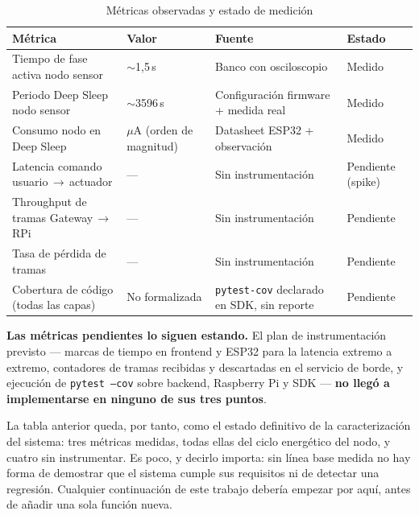 \begin{table}[H]
    \centering
    \caption{Métricas observadas y estado de medición}
    \begin{tabularx}{\textwidth}{Xlll}
        \toprule
        \textbf{Métrica}                                  & \textbf{Valor}            & \textbf{Fuente}                                & \textbf{Estado} \\
        \midrule
        Tiempo de fase activa nodo sensor                  & $\sim$1{,}5\,s            & Banco con osciloscopio                          & Medido \\
        Periodo Deep Sleep nodo sensor                     & $\sim$3596\,s             & Configuración firmware + medida real            & Medido \\
        Consumo nodo en Deep Sleep                         & $\mu$A (orden de magnitud)& Datasheet ESP32 + observación                  & Medido \\
        Latencia comando usuario\,$\rightarrow$\,actuador  & ---                       & Sin instrumentación                            & Pendiente (spike) \\
        Throughput de tramas Gateway\,$\rightarrow$\,RPi   & ---                       & Sin instrumentación                            & Pendiente \\
        Tasa de pérdida de tramas                           & ---                       & Sin instrumentación                            & Pendiente \\
        Cobertura de código (todas las capas)              & No formalizada            & \texttt{pytest-cov} declarado en SDK, sin reporte & Pendiente \\
        \bottomrule
    \end{tabularx}
    \label{tab:metrics}
\end{table}

\textbf{Las métricas pendientes lo siguen estando.} El plan de instrumentación
previsto --- marcas de tiempo en frontend y ESP32 para la latencia extremo a extremo,
contadores de tramas recibidas y descartadas en el servicio de borde, y ejecución de
\texttt{pytest --cov} sobre backend, Raspberry Pi y SDK --- \textbf{no llegó a
implementarse en ninguno de sus tres puntos}.

La tabla anterior queda, por tanto, como el estado definitivo de la caracterización
del sistema: tres métricas medidas, todas ellas del ciclo energético del nodo, y
cuatro sin instrumentar. Es poco, y decirlo importa: sin línea base medida no hay
forma de demostrar que el sistema cumple sus requisitos ni de detectar una regresión.
Cualquier continuación de este trabajo debería empezar por aquí, antes de añadir una
sola función nueva.

